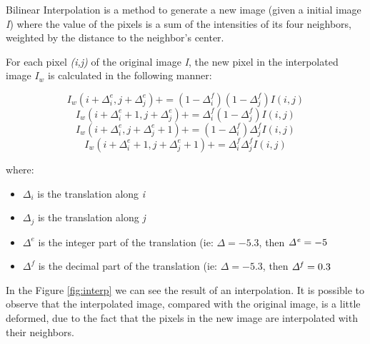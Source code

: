 \documentclass{article}
\begin{document}
	Bilinear Interpolation is a method to generate a new image (given a initial image {\it I}) where the value of the pixels is a sum of the intensities of its four neighbors, weighted by the distance to the neighbor's center.

	For each pixel {\it(i,j)} of the original image {\it I}, the new pixel in the interpolated image {\it $I_w$} is calculated in the following manner:

	\begin{equation}
		I_w(i+\Delta_i^e , j+\Delta_j^e) += (1-\Delta_i^f)(1-\Delta_j^f)I(i,j)
	\end{equation}
	\begin{equation}
		I_w(i+\Delta_i^e+1 , j+\Delta_j^e) += \Delta_i^f(1-\Delta_j^f)I(i,j)
	\end{equation}
	\begin{equation}
  		I_w(i+\Delta_i^e , j+\Delta_j^e+1) += (1-\Delta_i^f)\Delta_j^fI(i,j)
	\end{equation}
	\begin{equation}
		I_w(i+\Delta_i^e+1 , j+\Delta_j^e+1) += \Delta_i^f \Delta_j^fI(i,j)
	\end{equation}

	where: 
		\begin{itemize}
			\item {\it $\Delta_i$} is the translation along {\it i}
			\item {\it $\Delta_j$} is the translation along {\it j} 
			\item {\it $\Delta^e$} is the integer part of the translation (ie: $\Delta=-5.3$, then ${\it \Delta^e}=-5$
			\item {\it $\Delta^f$} is the decimal part of the translation (ie: $\Delta=-5.3$, then ${\it \Delta^f}=0.3$
		\end{itemize}

	In the Figure \ref{fig:interp} we can see the result of an interpolation. It is possible to observe that the interpolated image, compared with the original image, is a little deformed, due to the fact that the pixels in the new image are interpolated with their neighbors.
\end{document}
